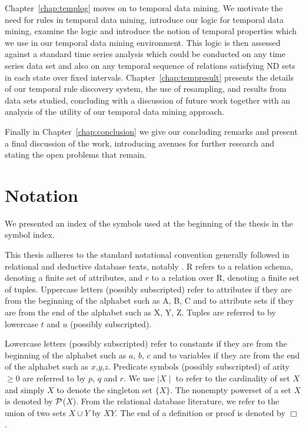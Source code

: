 Chapter~\ref{chap:templog} moves on to temporal data mining. We
motivate the need for rules in temporal data mining, introduce our
logic for temporal data mining, examine the logic and introduce the
notion of temporal properties which we use in our temporal data mining
environment. This logic is then assessed against a standard time series
analysis which could be conducted on any time series data set and also
on any temporal sequence of relations satisfying ND sets in each
state over fixed intervals. Chapter~\ref{chap:tempresult} presents the
details of our temporal 
rule discovery system, the use of resampling, and results from data
sets studied, concluding with a discussion of future work together
with an analysis of the utility of our temporal data mining approach.

\medskip

Finally in Chapter~\ref{chap:conclusion} we give our concluding
remarks and present a final discussion of the work, introducing
avenues for further research and stating the open problems that remain.


\section{Notation}\label{sec:not}

We presented an index of the symbols used at the beginning of the thesis
in the symbol index.

\smallskip

This thesis adheres to the standard notational convention generally followed in
relational and deductive database texts, notably \cite{Ullm88}.  R
refers to a relation 
schema, denoting a finite set of attributes,  and $r$ to a relation over R,
denoting a finite set of tuples.  Uppercase letters (possibly
subscripted) refer to attributes if they are from the beginning of the
alphabet such as A, B, C and to attribute sets if they are from the
end of the alphabet such as X, Y, Z.  Tuples are referred to by
lowercase $t$ and $u$ (possibly subscripted).

\medskip

Lowercase letters (possibly subscripted) refer to constants if they
are from the beginning of the alphabet such as $a$, $b$, $c$ and to
variables if they are from the end of the alphabet such as
$x$,$y$,$z$.  Predicate symbols (possibly subscripted) of arity $\ge
0$ are referred to by $p$, $q$ and $r$. 
We use $\mid X \mid$ to refer to the cardinality of set $X$ and simply
$X$ to denote the singleton set $\{ X \}$. The nonempty powerset of a
set $X$ is denoted by $\cal P$($X$). From the 
relational database literature, we refer to the union of
two sets $X \cup Y$ by $XY$. The end of a definition or proof is
denoted by $\Box$.


